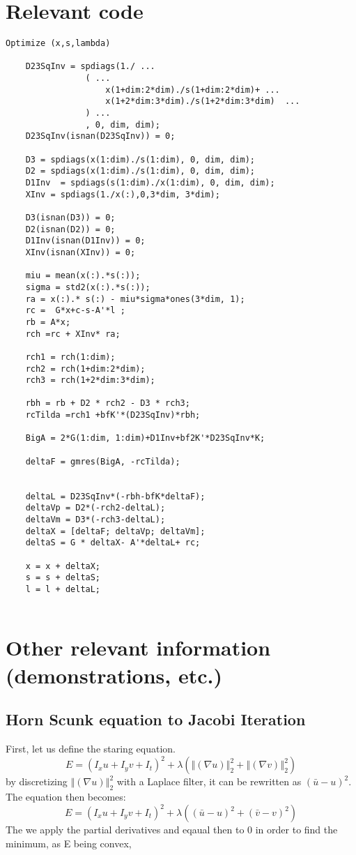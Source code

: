 \appendix

\chapter{Relevant code}


\begin{verbatim}
Optimize (x,s,lambda)

	D23SqInv = spdiags(1./ ...
				( ... 
					x(1+dim:2*dim)./s(1+dim:2*dim)+ ...
					x(1+2*dim:3*dim)./s(1+2*dim:3*dim)  ...
				) ...
				, 0, dim, dim);
	D23SqInv(isnan(D23SqInv)) = 0;
	
	D3 = spdiags(x(1:dim)./s(1:dim), 0, dim, dim);
	D2 = spdiags(x(1:dim)./s(1:dim), 0, dim, dim);
	D1Inv  = spdiags(s(1:dim)./x(1:dim), 0, dim, dim);        
	XInv = spdiags(1./x(:),0,3*dim, 3*dim);
	
	D3(isnan(D3)) = 0;
	D2(isnan(D2)) = 0;
	D1Inv(isnan(D1Inv)) = 0;
	XInv(isnan(XInv)) = 0;
	
	miu = mean(x(:).*s(:));
	sigma = std2(x(:).*s(:));
	ra = x(:).* s(:) - miu*sigma*ones(3*dim, 1);
	rc =  G*x+c-s-A'*l ;
	rb = A*x;
	rch =rc + XInv* ra;
	
	rch1 = rch(1:dim);
	rch2 = rch(1+dim:2*dim);
	rch3 = rch(1+2*dim:3*dim);
	
	rbh = rb + D2 * rch2 - D3 * rch3;
	rcTilda =rch1 +bfK'*(D23SqInv)*rbh;
	
	BigA = 2*G(1:dim, 1:dim)+D1Inv+bf2K'*D23SqInv*K;
	
	deltaF = gmres(BigA, -rcTilda);
	
	
	deltaL = D23SqInv*(-rbh-bfK*deltaF);
	deltaVp = D2*(-rch2-deltaL);
	deltaVm = D3*(-rch3-deltaL);
	deltaX = [deltaF; deltaVp; deltaVm];
	deltaS = G * deltaX- A'*deltaL+ rc;
	
	x = x + deltaX;
	s = s + deltaS;
	l = l + deltaL;


\end{verbatim}

\chapter{Other relevant information (demonstrations, etc.)}
\section{Horn Scunk equation to Jacobi Iteration} \label{GSDemo}
First, let us define the staring equation.
\begin{equation}
	E = (I_xu+ I_yv + I_t)^2 + \lambda(\left\Vert(\nabla u) \right\Vert_2^2 +\left\Vert(\nabla v)\right\Vert_2^2)
\end{equation}
by discretizing $\left\Vert(\nabla u) \right\Vert_2^2$ with a Laplace filter, it can be rewritten as $(\bar{u}-u)^2$. The equation then becomes:
\begin{equation}
E = (I_xu+ I_yv + I_t)^2 + \lambda((\bar{u}-u)^2+(\bar{v}-v)^2)
\end{equation}
The we apply the partial derivatives and eqaual then to 0 in order to find the minimum, as E being convex,

